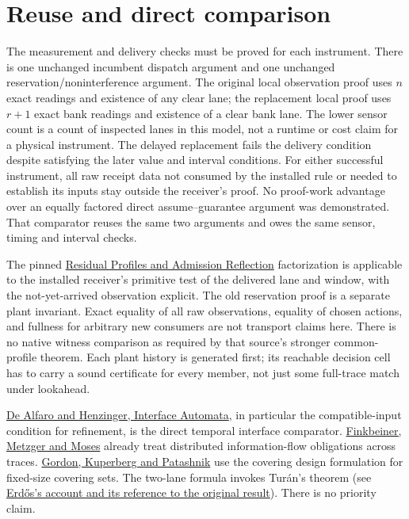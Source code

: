 \documentclass[11pt]{article}
\begin{document}
\section{Reuse and direct comparison}
The measurement and delivery checks must be proved for each instrument. There is one unchanged incumbent dispatch argument and one unchanged reservation/noninterference argument. The original local observation proof uses $n$ exact readings and existence of any clear lane; the replacement local proof uses $r+1$ exact bank readings and existence of a clear bank lane. The lower sensor count is a count of inspected lanes in this model, not a runtime or cost claim for a physical instrument. The delayed replacement fails the delivery condition despite satisfying the later value and interval conditions. For either successful instrument, all raw receipt data not consumed by the installed rule or needed to establish its inputs stay outside the receiver's proof. No proof-work advantage over an equally factored direct assume--guarantee argument was demonstrated. That comparator reuses the same two arguments and owes the same sensor, timing and interval checks.

The pinned \href{https://github.com/eternal-november/eos-research-programmes/blob/e1348964f73704212d2d8b48d5982a5ed600a2ff/projects/contextual-composition/feedback-and-concurrency/observable-covers/Residual_Profiles_and_Admission_Reflection.tex}{Residual Profiles and Admission Reflection} factorization is applicable to the installed receiver's primitive test of the delivered lane and window, with the not-yet-arrived observation explicit. The old reservation proof is a separate plant invariant. Exact equality of all raw observations, equality of chosen actions, and fullness for arbitrary new consumers are not transport claims here. There is no native witness comparison as required by that source's stronger common-profile theorem. Each plant history is generated first; its reachable decision cell has to carry a sound certificate for every member, not just some full-trace match under lookahead.

\href{https://web.cs.wpi.edu/~heineman/html/teaching_/CS562/p109-de_alfaro.pdf}{De Alfaro and Henzinger, Interface Automata}, in particular the compatible-input condition for refinement, is the direct temporal interface comparator. \href{https://arxiv.org/abs/2205.12085}{Finkbeiner, Metzger and Moses} already treat distributed information-flow obligations across traces. \href{https://arxiv.org/abs/math/9502238}{Gordon, Kuperberg and Patashnik} use the covering design formulation for fixed-size covering sets. The two-lane formula invokes Tur\'an's theorem (see \href{https://www.renyi.hu/~p_erdos/1971-01.pdf}{Erd\H{o}s's account and its reference to the original result}). There is no priority claim.
\end{document}

